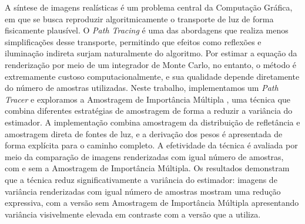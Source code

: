 \begin{resumo}
  A síntese de imagens realísticas é um problema central da Computação Gráfica,
  em que se busca reproduzir algoritmicamente o transporte de luz de forma
  fisicamente plausível. O \emph{Path Tracing} é uma das abordagens que realiza
  menos simplificações desse transporte, permitindo que efeitos como reflexões
  e iluminação indireta surjam naturalmente do algoritmo. Por estimar a equação
  da renderização \citep{kajiya86} por meio de um integrador de Monte Carlo, no
  entanto, o método é extremamente custoso computacionalmente, e sua qualidade
  depende diretamente do número de amostras utilizadas. Neste trabalho,
  implementamos um \emph{Path Tracer} e exploramos a Amostragem de Importância
  Múltipla \citep{veach95}, uma técnica que combina diferentes estratégias de
  amostragem de forma a reduzir a variância do estimador. A implementação
  combina amostragem da distribuição de refletância e amostragem direta de
  fontes de luz, e a derivação dos pesos é apresentada de forma explícita para
  o caminho completo. A efetividade da técnica é avaliada por meio da
  comparação de imagens renderizadas com igual número de amostras, com e sem a
  Amostragem de Importância Múltipla. Os resultados demonstram que a técnica
  reduz significativamente a variância do estimador: imagens de variância
  renderizadas com igual número de amostras mostram uma redução expressiva, com
  a versão sem Amostragem de Importância Múltipla apresentando variância
  visivelmente elevada em contraste com a versão que a utiliza.

\end{resumo}
